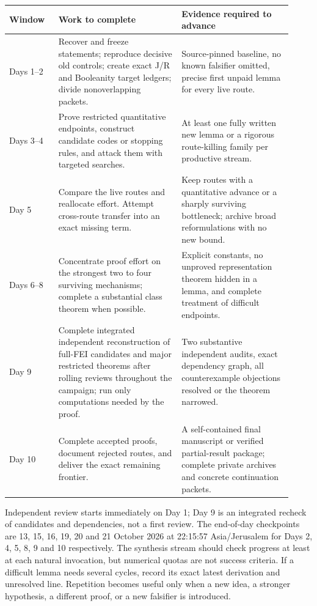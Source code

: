 \documentclass[11pt]{article}
\begin{document}
\begin{longtable}{>{\raggedright\arraybackslash}p{0.16\linewidth}>{\raggedright\arraybackslash}p{0.40\linewidth}>{\raggedright\arraybackslash}p{0.36\linewidth}}
\toprule
Window & Work to complete & Evidence required to advance \\
\midrule\endhead
Days 1--2 & Recover and freeze statements; reproduce decisive old controls; create exact J/R and Booleanity target ledgers; divide nonoverlapping packets. & Source-pinned baseline, no known falsifier omitted, precise first unpaid lemma for every live route. \\
Days 3--4 & Prove restricted quantitative endpoints, construct candidate codes or stopping rules, and attack them with targeted searches. & At least one fully written new lemma or a rigorous route-killing family per productive stream. \\
Day 5 & Compare the live routes and reallocate effort. Attempt cross-route transfer into an exact missing term. & Keep routes with a quantitative advance or a sharply surviving bottleneck; archive broad reformulations with no new bound. \\
Days 6--8 & Concentrate proof effort on the strongest two to four surviving mechanisms; complete a substantial class theorem when possible. & Explicit constants, no unproved representation theorem hidden in a lemma, and complete treatment of difficult endpoints. \\
Day 9 & Complete integrated independent reconstruction of full-FEI candidates and major restricted theorems after rolling reviews throughout the campaign; run only computations needed by the proof. & Two substantive independent audits, exact dependency graph, all counterexample objections resolved or the theorem narrowed. \\
Day 10 & Complete accepted proofs, document rejected routes, and deliver the exact remaining frontier. & A self-contained final manuscript or verified partial-result package; complete private archives and concrete continuation packets. \\
\bottomrule
\end{longtable}

Independent review starts immediately on Day 1; Day 9 is an integrated recheck of candidates and dependencies, not a first review. The end-of-day checkpoints are 13, 15, 16, 19, 20 and 21 October 2026 at 22:15:57 Asia/Jerusalem for Days 2, 4, 5, 8, 9 and 10 respectively. The synthesis stream should check progress at least at each natural invocation, but numerical quotas are not success criteria. If a difficult lemma needs several cycles, record its exact latest derivation and unresolved line. Repetition becomes useful only when a new idea, a stronger hypothesis, a different proof, or a new falsifier is introduced.
\end{document}
